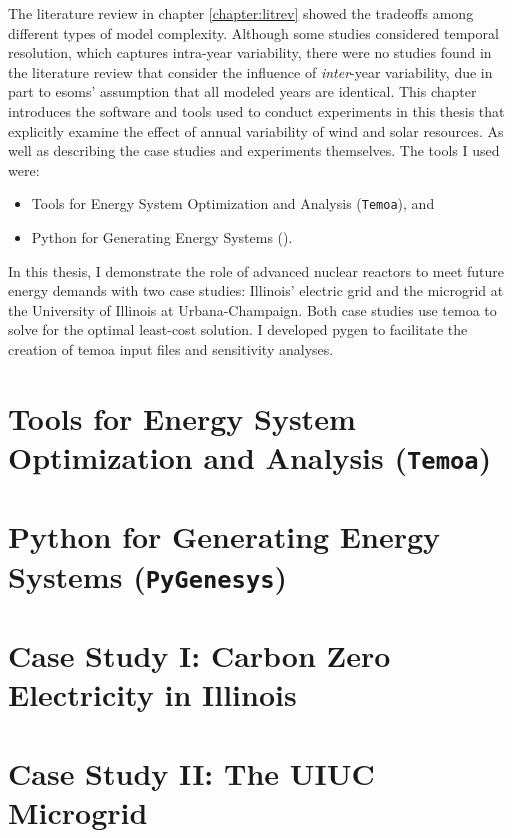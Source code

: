 The literature review in chapter \ref{chapter:litrev} showed the tradeoffs among
different types of model complexity. Although some studies considered temporal
resolution, which captures intra-year variability, there were no studies found in
the literature review that consider the influence of \textit{inter}-year variability,
due in part to \glspl{esom}' assumption that all modeled years are identical.
This chapter introduces the software and tools used to conduct experiments in this
thesis that explicitly examine the effect of annual variability of wind and solar
resources. As well as describing the case studies and experiments themselves.
The tools I used were:
\begin{itemize}
  \item Tools for Energy System Optimization and Analysis (\texttt{Temoa}), and
  \item Python for Generating Energy Systems (\pygen).
\end{itemize}
In this thesis, I demonstrate the role of advanced nuclear reactors to meet future
energy demands with two case studies: Illinois’ electric grid and the microgrid
at the University of Illinois at Urbana-Champaign. Both case studies use \gls{temoa}
\cite{decarolis_temoa_2010} to solve for the optimal least-cost solution. I
developed \gls{pygen} \cite{dotson_python_2021} to facilitate the creation of
\gls{temoa} input files and sensitivity analyses.

\section{Tools for Energy System Optimization and Analysis (\texttt{Temoa})}


\section{Python for Generating Energy Systems (\texttt{PyGenesys})}



\section{Case Study I: Carbon Zero Electricity in Illinois}
\label{section:ilmodel}


\section{Case Study II: The UIUC Microgrid}
\label{section:uiucmodel}


